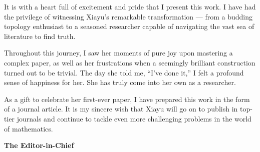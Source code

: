 
It is with a heart full of excitement and pride that I present this work. I have had the privilege of witnessing Xiayu’s remarkable transformation --- from a budding topology enthusiast to a seasoned researcher capable of navigating the vast sea of literature to find truth.

Throughout this journey, I saw her moments of pure joy upon mastering a complex paper, as well as her frustrations when a seemingly brilliant construction turned out to be trivial. The day she told me, ``I've done it,'' I felt a profound sense of happiness for her. She has truly come into her own as a researcher.

As a gift to celebrate her first-ever paper, I have prepared this work in the form of a journal article. It is my sincere wish that Xiayu will go on to publish in top-tier journals and continue to tackle even more challenging problems in the world of mathematics.

\begin{flushleft}
  \bfseries
  The Editor-in-Chief
\end{flushleft}
